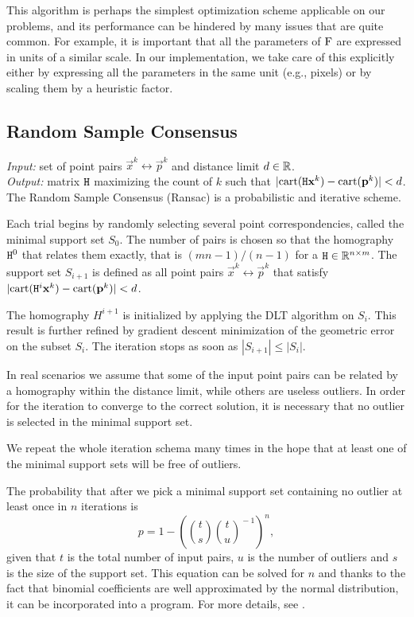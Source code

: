 This algorithm is perhaps the simplest optimization scheme applicable on our problems, and its performance can be hindered by many issues that are quite common.
For example, it is important that all the parameters of $\mathrm{F}$ are expressed in units of a similar scale.
In our implementation, we take care of this explicitly either by expressing all the parameters in the same unit (e.g., pixels) or by scaling them by a heuristic factor.

\subsection{Random Sample Consensus}

\textit{Input:} set of point pairs $\vec x^k \leftrightarrow \vec p^k$ and distance limit $d \in \mathbb{R}$.\\
\textit{Output:} matrix $\mathtt{H}$ maximizing the count of $k$ such that $|\mathrm{cart}(\mathtt{H} \mathbf{x}^k) - \mathrm{cart}(\mathbf{p}^k)| < d$.\\

The Random Sample Consensus (Ransac) is a probabilistic and iterative scheme.

Each trial begins by randomly selecting several point correspondencies, called the minimal support set $S_0$.
The number of pairs is chosen so that the homography $\mathtt{H}^0$ that relates them exactly, that is $(mn - 1) / (n -1)$ for a $\mathtt{H} \in \mathbb{R}^{n \times m}$.
The support set $S_{i + 1}$ is defined as all point pairs $\vec x^k \leftrightarrow \vec p^k$ that satisfy $|\mathrm{cart}(\mathtt{H}^{i} \mathbf{x}^k) - \mathrm{cart}(\mathbf{p}^k)| < d$.

The homography $H^{i + 1}$ is initialized by applying the DLT algorithm on $S_{i}$.
This result is further refined by gradient descent minimization of the geometric error on the subset $S_{i}$.
The iteration stops as soon as $|S_{i + 1}| \leq |S_{i}|$.

In real scenarios we assume that some of the input point pairs can be related by a homography within the distance limit, while others are useless outliers.
In order for the iteration to converge to the correct solution, it is necessary that no outlier is selected in the minimal support set.

We repeat the whole iteration schema many times in the hope that at least one of the minimal support sets will be free of outliers.

The probability that after we pick a minimal support set containing no outlier at least once in $n$ iterations is
\begin{equation}
p = 1 - \left( {t \choose s} {t \choose u}^{\!\!-1} \right)^n,
\end{equation}
given that $t$ is the total number of input pairs, $u$ is the number of outliers and $s$ is the size of the support set.
This equation can be solved for $n$ and thanks to the fact that binomial coefficients are well approximated by the normal distribution, it can be incorporated into a program.
For more details, see \cite[p.117]{hartley03}.

